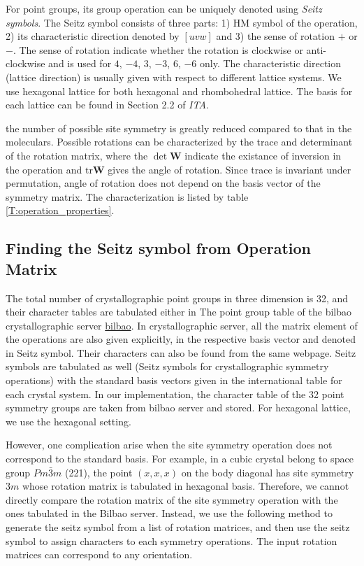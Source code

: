 \documentclass{article}
\begin{document}
For point groups, its group operation can be uniquely denoted using \emph{Seitz symbols}. The Seitz symbol consists of 
three parts: 1) HM symbol of the operation, 2) its characteristic direction denoted by $[uvw]$ and 3) the sense of rotation $+$ or $-$. 
The sense of rotation indicate whether the rotation is clockwise or anti-clockwise and is used for $4$, $-4$, $3$, $-3$, $6$, $-6$ only.
The characteristic direction (lattice direction) is usually given with respect to different lattice systems. We use hexagonal lattice 
for both hexagonal and rhombohedral lattice. The basis for each lattice can be found in Section 2.2 of \emph{ITA}. 

the number of possible site symmetry is greatly reduced compared to 
that in the moleculars. Possible rotations can be characterized by the trace 
and determinant of the rotation matrix, where the $\det\mathbf{W}$ indicate the 
existance of inversion in the operation and $\text{tr}\mathbf{W}$ gives the angle of rotation. 
Since trace is invariant under permutation, angle of rotation does not depend on the 
basis vector of the symmetry matrix. The characterization is listed by table \ref{T:operation_properties}.

\subsection{Finding the Seitz symbol from Operation Matrix}


The total number of crystallographic point groups in three dimension is 32, and their character tables are 
tabulated either in The point group table of the bilbao crystallographic server \href{https://www.cryst.ehu.es/rep/point.html}{bilbao}. 
In crystallographic server, all the matrix element of the operations are also given explicitly, in the respective basis vector 
and denoted in Seitz symbol. Their characters can also be found from the same webpage.
Seitz symbols are tabulated as well (Seitz symbols for crystallographic symmetry operations)
with the standard basis vectors given in the international table for each crystal system. 
In our implementation, the character table of the 32 point symmetry groups are taken from bilbao server and 
stored. For hexagonal lattice, we use the hexagonal setting.

However, one complication arise when the site symmetry operation does not correspond to the standard basis. For example, 
in a cubic crystal belong to space group $Pm\bar{3}m$ (221), the point $(x,x,x)$ on the body diagonal has site symmetry $3m$
whose rotation matrix is tabulated in hexagonal basis. Therefore, we cannot directly compare the rotation matrix of the 
site symmetry operation with the ones tabulated in the Bilbao server. Instead, we use the following method to generate 
the seitz symbol from a list of rotation matrices, and then use the seitz symbol to assign characters to each symmetry 
operations. The input rotation matrices can correspond to any orientation.
\end{document}
